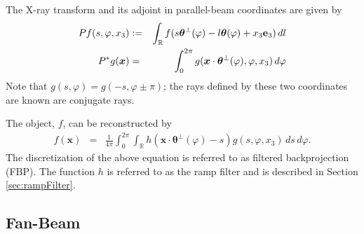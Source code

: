 \documentclass[11pt]{article}
\begin{document}
The X-ray transform and its adjoint in parallel-beam coordinates are given by 
\begin{eqnarray*}
Pf(s, \varphi, x_3) &:=& \int_\mathbb{R} f(s\bm{\theta}^\perp(\varphi) - l\bm{\theta}(\varphi) + x_3\textbf{e}_3) \, dl \\
P^*g(\bm{x}) &=& \int_0^{2\pi} g(\bm{x}\cdot\bm{\theta}^\perp(\varphi), \varphi, x_3) \, d\varphi
\end{eqnarray*}
Note that $g(s,\varphi) = g(-s,\varphi \pm \pi)$; the rays defined by these two coordinates are known are conjugate rays.

The object, $f$, can be reconstructed by
\begin{eqnarray*}
f(\bm{x}) &=& \frac{1}{4\pi} \int_0^{2\pi} \int_\mathbb{R} h(\bm{x}\cdot\bm{\theta}^\perp(\varphi) - s) g(s,\varphi, x_3) \, ds \, d\varphi.
\end{eqnarray*}
The discretization of the above equation is referred to as filtered backprojection (FBP).  The function $h$ is referred to as the ramp filter and is described in Section \ref{sec:rampFilter}.

\subsection{Fan-Beam}
\end{document}
